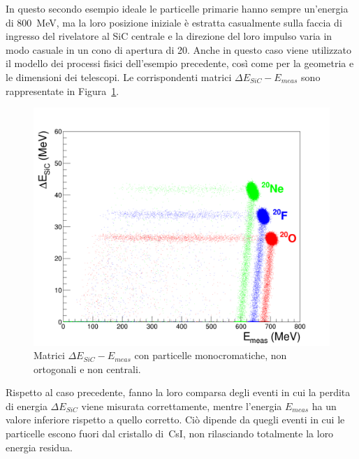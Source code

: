In questo secondo esempio ideale le particelle primarie hanno sempre un'energia di 800~MeV, ma la loro posizione iniziale è estratta casualmente sulla faccia di ingresso del rivelatore al SiC centrale e la direzione del loro impulso varia in modo casuale in un cono di apertura di 20\textdegree{}.
Anche in questo caso viene utilizzato il modello dei processi fisici dell'esempio precedente, così come per la geometria e le dimensioni dei telescopi.
Le corrispondenti matrici $\Delta E_{SiC} - E_{meas}$ sono rappresentate in Figura~\ref{fig:deltaE_ETot_full_energy}.
\begin{figure} [!p]
	\centering
	\includegraphics[width=\textwidth, keepaspectratio]{Grafici_Tesi2/Particelle_non_ortogonali/deltaE_ETot_intero_range_quadrata.png}
	\caption{Matrici $\Delta E_{SiC} - E_{meas}$ con particelle monocromatiche, non ortogonali e non centrali.} \label{fig:deltaE_ETot_full_energy}
\end{figure}
Rispetto al caso precedente, fanno la loro comparsa degli eventi in cui la perdita di energia $\Delta E_{SiC}$ viene misurata correttamente, mentre l'energia $E_{meas}$ ha un valore inferiore rispetto a quello corretto. 
Ciò dipende da quegli eventi in cui le particelle escono fuori dal cristallo di~CsI, non rilasciando totalmente la loro energia residua.

